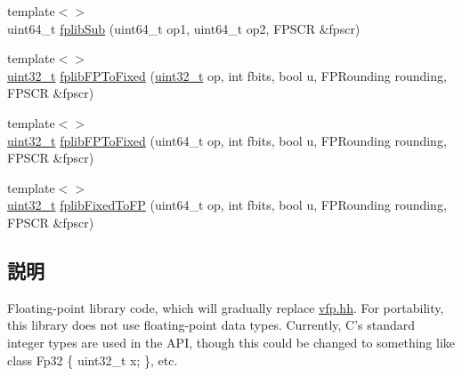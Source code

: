\begin{DoxyCompactItemize}
\item 
{\footnotesize template$<$$>$ }\\uint64\_\-t \hyperlink{namespaceArmISA_a5539c238bb713d0c19f26de311cc79a0}{fplibSub} (uint64\_\-t op1, uint64\_\-t op2, FPSCR \&fpscr)
\item 
{\footnotesize template$<$$>$ }\\\hyperlink{Type_8hh_a435d1572bf3f880d55459d9805097f62}{uint32\_\-t} \hyperlink{namespaceArmISA_a7ceb39cb77f124c2c26f681bd0df8956}{fplibFPToFixed} (\hyperlink{Type_8hh_a435d1572bf3f880d55459d9805097f62}{uint32\_\-t} op, int fbits, bool u, FPRounding rounding, FPSCR \&fpscr)
\item 
{\footnotesize template$<$$>$ }\\\hyperlink{Type_8hh_a435d1572bf3f880d55459d9805097f62}{uint32\_\-t} \hyperlink{namespaceArmISA_a8f2d3f03200c9b30566340f50f9678fe}{fplibFPToFixed} (uint64\_\-t op, int fbits, bool u, FPRounding rounding, FPSCR \&fpscr)
\item 
{\footnotesize template$<$$>$ }\\\hyperlink{Type_8hh_a435d1572bf3f880d55459d9805097f62}{uint32\_\-t} \hyperlink{namespaceArmISA_ad1582732786716fd44209d3a9935bba7}{fplibFixedToFP} (uint64\_\-t op, int fbits, bool u, FPRounding rounding, FPSCR \&fpscr)
\end{DoxyCompactItemize}


\subsection{説明}
Floating-\/point library code, which will gradually replace \hyperlink{vfp_8hh}{vfp.hh}. For portability, this library does not use floating-\/point data types. Currently, C's standard integer types are used in the API, though this could be changed to something like class Fp32 \{ uint32\_\-t x; \}, etc. 